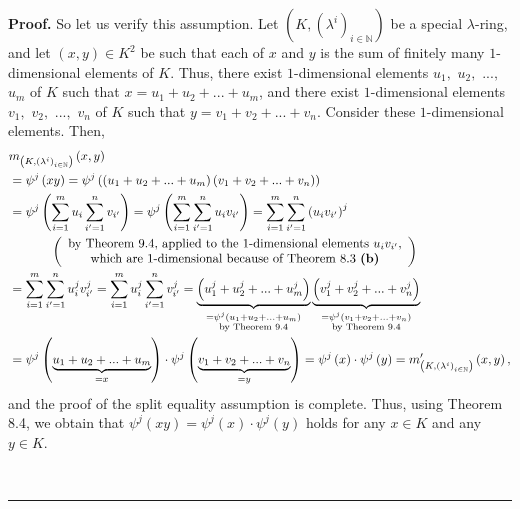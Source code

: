 \documentclass[numbers=enddot,12pt,final,onecolumn,notitlepage]{scrartcl}%
\newenvironment{proof}[1][Proof]{\noindent\textbf{#1.} }{\ \rule{0.5em}{0.5em}}
\begin{document}
\begin{proof}
So let us verify this assumption. Let $\left(  K,\left(  \lambda^{i}\right)
_{i\in\mathbb{N}}\right)  $ be a special $\lambda$-ring, and let $\left(
x,y\right)  \in K^{2}$ be such that each of $x$ and $y$ is the sum of finitely
many $1$-dimensional elements of $K$. Thus, there exist $1$-dimensional
elements $u_{1},$ $u_{2},$ $...,$ $u_{m}$ of $K$ such that $x=u_{1}%
+u_{2}+...+u_{m}$, and there exist $1$-dimensional elements $v_{1},$ $v_{2},$
$...,$ $v_{n}$ of $K$ such that $y=v_{1}+v_{2}+...+v_{n}$. Consider these
$1$-dimensional elements. Then,%
\begin{align*}
&  m_{\left(  K,\left(  \lambda^{i}\right)  _{i\in\mathbb{N}}\right)  }\left(
x,y\right) \\
&  =\psi^{j}\left(  xy\right)  =\psi^{j}\left(  \left(  u_{1}+u_{2}%
+...+u_{m}\right)  \left(  v_{1}+v_{2}+...+v_{n}\right)  \right) \\
&  =\psi^{j}\left(  \sum_{i=1}^{m}u_{i}\sum_{i^{\prime}=1}^{n}v_{i^{\prime}%
}\right)  =\psi^{j}\left(  \sum_{i=1}^{m}\sum_{i^{\prime}=1}^{n}%
u_{i}v_{i^{\prime}}\right)  =\sum_{i=1}^{m}\sum_{i^{\prime}=1}^{n}\left(
u_{i}v_{i^{\prime}}\right)  ^{j}\\
&  \ \ \ \ \ \ \ \ \ \ \left(
\begin{array}
[c]{c}%
\text{by Theorem 9.4, applied to the }1\text{-dimensional elements }%
u_{i}v_{i^{\prime}}\text{,}\\
\text{which are }1\text{-dimensional because of Theorem 8.3 \textbf{(b)}}%
\end{array}
\right) \\
&  =\sum_{i=1}^{m}\sum_{i^{\prime}=1}^{n}u_{i}^{j}v_{i^{\prime}}^{j}%
=\sum_{i=1}^{m}u_{i}^{j}\sum_{i^{\prime}=1}^{n}v_{i^{\prime}}^{j}%
=\underbrace{\left(  u_{1}^{j}+u_{2}^{j}+...+u_{m}^{j}\right)  }%
_{\substack{=\psi^{j}\left(  u_{1}+u_{2}+...+u_{m}\right)  \\\text{by Theorem
9.4}}}\underbrace{\left(  v_{1}^{j}+v_{2}^{j}+...+v_{n}^{j}\right)
}_{\substack{=\psi^{j}\left(  v_{1}+v_{2}+...+v_{n}\right)  \\\text{by Theorem
9.4}}}\\
&  =\psi^{j}\left(  \underbrace{u_{1}+u_{2}+...+u_{m}}_{=x}\right)  \cdot
\psi^{j}\left(  \underbrace{v_{1}+v_{2}+...+v_{n}}_{=y}\right)  =\psi
^{j}\left(  x\right)  \cdot\psi^{j}\left(  y\right)  =m_{\left(  K,\left(
\lambda^{i}\right)  _{i\in\mathbb{N}}\right)  }^{\prime}\left(  x,y\right)  ,
\end{align*}
and the proof of the split equality assumption is complete. Thus, using
Theorem 8.4, we obtain that $\psi^{j}\left(  xy\right)  =\psi^{j}\left(
x\right)  \cdot\psi^{j}\left(  y\right)  $ holds for any $x\in K$ and any
$y\in K$.


\end{proof}
\end{document}
